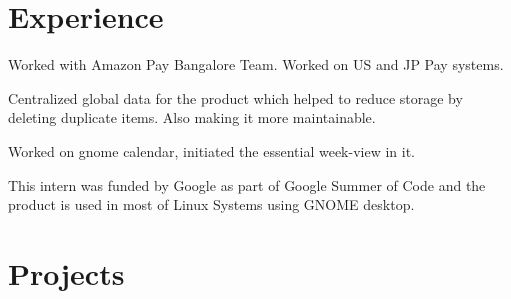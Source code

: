 \documentclass[letterpaper]{deedy-resume} %
\begin{document}
\hfill
%
%
\begin{minipage}[t]{0.66\textwidth} %


\section{Experience}


\vspace{\topsep} %
\begin{tightitemize}
\item Worked with Amazon Pay Bangalore Team. Worked on US and JP Pay systems.
\item Centralized global data for the product which helped to reduce storage by deleting duplicate items. Also making it more maintainable.
\end{tightitemize}

\sectionspace %



\begin{tightitemize}
\item Worked on gnome calendar, initiated the essential week-view in it.
\item This intern was funded by Google as part of Google Summer of Code and the product is used in most of Linux Systems using GNOME desktop.
\end{tightitemize}

\sectionspace %


\section{Projects}


\end{minipage}
\end{document}
